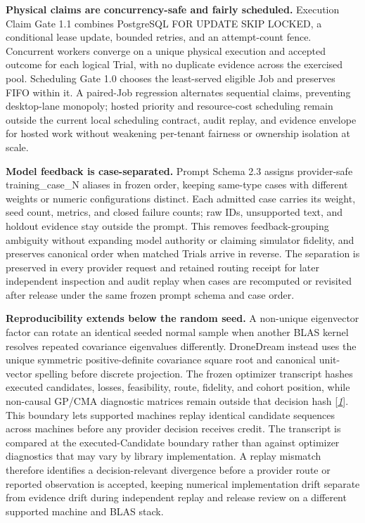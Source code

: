 \textbf{Physical claims are concurrency-safe and fairly scheduled.}
Execution Claim Gate 1.1 combines PostgreSQL FOR UPDATE SKIP LOCKED, a
conditional lease update, bounded retries, and an attempt-count fence.
Concurrent workers converge on a unique physical execution and accepted
outcome for each logical Trial, with no duplicate evidence across the
exercised pool. Scheduling Gate 1.0 chooses the least-served eligible
Job and preserves FIFO within it. A paired-Job regression alternates
sequential claims, preventing
desktop-lane monopoly; hosted priority and resource-cost scheduling
remain outside the current local scheduling contract, audit replay, and
evidence envelope for hosted work without weakening per-tenant fairness
or ownership isolation at scale.

\textbf{Model feedback is case-separated.}
Prompt Schema 2.3 assigns provider-safe
\mbox{training\_case\_N} aliases in
frozen order, keeping same-type cases with different weights or numeric
configurations distinct. Each admitted case carries its weight, seed
count, metrics, and closed failure counts; raw IDs, unsupported text,
and holdout evidence stay outside the prompt. This removes
feedback-grouping ambiguity without expanding model authority or
claiming simulator
fidelity, and preserves canonical order when matched Trials arrive in
reverse. The separation is preserved in every provider request and
retained routing receipt for later independent inspection and audit
replay when cases are recomputed or revisited after release under the same
frozen prompt schema and case order.

\textbf{Reproducibility extends below the random seed.} A non-unique
eigenvector factor can rotate an identical seeded normal sample when
another BLAS kernel resolves repeated covariance eigenvalues
differently. DroneDream instead uses the unique symmetric
positive-definite covariance square root and canonical unit-vector
spelling before discrete projection. The frozen optimizer transcript
hashes executed candidates, losses, feasibility,
route, fidelity, and cohort position, while non-causal GP/CMA diagnostic
matrices remain outside that decision hash
{[}\protect\hyperlink{ref_1}{\emph{1}}{]}. This boundary lets supported
machines replay identical candidate sequences across machines before any
provider decision receives credit. The transcript is compared at the
executed-Candidate boundary rather than against optimizer diagnostics
that may vary by library implementation. A replay mismatch therefore
identifies a decision-relevant divergence before a provider route or
reported observation is accepted, keeping numerical implementation drift
separate from evidence drift during independent replay and release
review on a different supported machine and BLAS stack.

